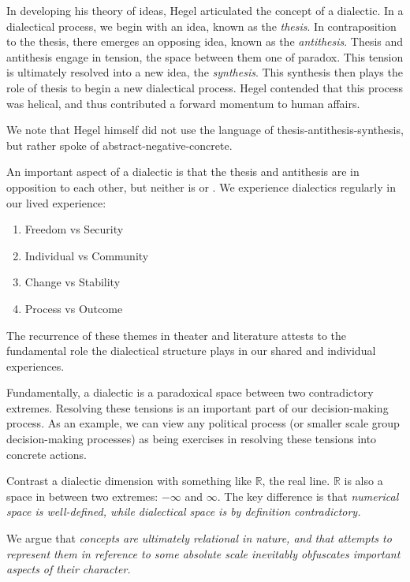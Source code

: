 In developing his theory of ideas, Hegel articulated the concept of a dialectic.
In a dialectical process, we begin with an idea, known as the \textit{thesis}.
In contraposition to the thesis, there emerges an opposing idea, known as the \textit{antithesis}.
Thesis and antithesis engage in tension, the space between them one of paradox.
This tension is ultimately resolved into a new idea, the \textit{synthesis}.
This synthesis then plays the role of thesis to begin a new dialectical process.
Hegel contended that this process was helical, and thus contributed a forward momentum to human affairs.

We note that Hegel himself did not use the language of thesis-antithesis-synthesis, but rather spoke of abstract-negative-concrete.

An important aspect of a dialectic is that the thesis and antithesis are in opposition to each other, but neither is  or .
We experience dialectics regularly in our lived experience:

\begin{enumerate}
  \item Freedom vs Security
  \item Individual vs Community
  \item Change vs Stability
  \item Process vs Outcome
\end{enumerate}

The recurrence of these themes in theater and literature attests to the fundamental role the dialectical structure plays in our shared and individual experiences.

Fundamentally, a dialectic is a paradoxical space between two contradictory extremes.
Resolving these tensions is an important part of our decision-making process.
As an example, we can view any political process (or smaller scale group decision-making processes) as being exercises in resolving these tensions into concrete actions.

Contrast a dialectic dimension with something like $\mathbb{R}$, the real line.
$\mathbb{R}$ is also a space in between two extremes: $-\infty$ and $\infty$.
The key difference is that \textit{numerical space is well-defined, while dialectical space is by definition contradictory.}

We argue that \textit{concepts are ultimately relational in nature, and that attempts to represent them in reference to some absolute scale inevitably obfuscates important aspects of their character.}

